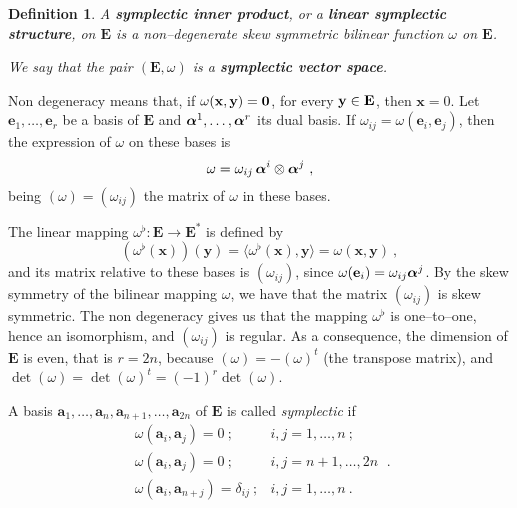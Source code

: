 \documentclass[12pt]{report}
\newtheorem{definition}[teor]{Definition}
\renewcommand{\neq}{=\hspace{-3.5mm}/\hspace{2mm}}
\begin{document}
\begin{definition}
A \textbf{symplectic inner product}, or a
\textbf{linear symplectic structure}, on $\textbf{E}$ is a non--degenerate skew symmetric bilinear function $\omega$ on $\textbf{E}$.

We say that the pair $(\textbf{E},\omega)$ is a \textbf{symplectic vector space}. 
\end{definition}

Non degeneracy means that, if $\omega(\bf{x},\bf{y})=0$, for every $\bf{y}\in \textbf{E}$, then $\mathbf{x}=0$. 
Let $\mathbf{e}_{1},\ldots,\mathbf{e}_{r}$ be a basis of $\textbf{E}$ and $\mbox{\boldmath $\alpha$}^{1},\ldots,\mbox{\boldmath $\alpha$}^{r}$ its dual basis. If $\omega_{ij}=\omega(\mathbf{e}_{i},\mathbf{e}_{j})$, then the expression of $\omega$ on these bases is
$$
\omega=\omega_{ij}\,\mbox{\boldmath $\alpha$}^{i}\otimes\mbox{\boldmath $\alpha$}^{j}\ ,
$$
being $(\omega)=(\omega_{ij})$ the matrix of $\omega$ in these bases.

The linear mapping $\omega^{\flat}:\textbf{E}\to \textbf{E}^{*}$ is defined by
$$
(\omega^{\flat}(\mathbf{x}))(\mathbf{y})=\langle\omega^{\flat}(\mathbf{x}),\mathbf{y}\rangle=\omega(\mathbf{x},\mathbf{y})\ ,
$$
and its matrix relative to these bases is  $(\omega_{ij})$,
since $\omega(\mathbf{e}_{i})=\omega_{ij}\mbox{\boldmath $\alpha$}^{j}$.
By the skew symmetry of the bilinear mapping $\omega$, we have that the matrix $(\omega_{ij})$ is skew symmetric. The non degeneracy gives us that the mapping $\omega^{\flat}$ is one--to--one, hence an isomorphism, and $(\omega_{ij})$ is regular. 
As a consequence, the dimension of $\textbf{E}$ is even, that is $r=2n$, because $(\omega)=-(\omega)^{t}$ (the transpose matrix),
and $\det(\omega)=\det(\omega)^{t}=(-1)^{r}\det(\omega)$.

A basis $\mathbf{a}_{1},\ldots,\mathbf{a}_{n}, \mathbf{a}_{n+1},\ldots,\mathbf{a}_{2n}$ of $\textbf{E}$ is called \textsl{symplectic} if
$$
\begin{matrix}
 \omega(\mathbf{a}_{i},\mathbf{a}_{j})=0 \ ;&  i,j=1,\ldots,n \ ; \\ 
\omega(\mathbf{a}_{i},\mathbf{a}_{j})=0 \ ;&  i,j=n+1,\ldots,2n\\
\omega(\mathbf{a}_{i},\mathbf{a}_{n+j})=\delta_{ij} \ ;& i,j=1,\ldots,n \ .
 \end{matrix}\ .
$$

\end{document}
